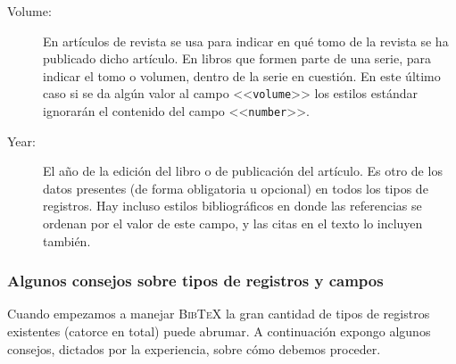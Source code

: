 \documentclass[a4paper,11pt]{article}
\def\btx-{\textsc{Bib\TeX}}
\def\ltr#1-{<<\texttt{#1}>>}
\begin{document}
\begin{description}
\item[Volume:] En artículos  de revista se usa para indicar en  qué tomo de la
  revista se ha  publicado dicho artículo.  En libros que  formen parte de una
  serie, para  indicar el tomo o volumen,  dentro de la serie  en cuestión. En
  este último  caso si  se da algún  valor al  campo \ltr volume-  los estilos
  estándar ignorarán el contenido del campo \ltr number-.

\item[Year:] El año de la edición  del libro o de publicación del artículo. Es
  otro de los  datos presentes (de forma obligatoria u  opcional) en todos los
  tipos  de  registros.   Hay  incluso  estilos bibliográficos  en  donde  las
  referencias se ordenan por  el valor de este campo, y las  citas en el texto
  lo incluyen también.

\end{description}

\subsubsection{Algunos consejos sobre tipos de registros y campos}
\label{sec:algun-cons-sobre}

Cuando  empezamos a  manejar  \btx- la  gran  cantidad de  tipos de  registros
existentes (catorce  en total) puede abrumar.  A  continuación expongo algunos
consejos, dictados por la experiencia, sobre cómo debemos proceder.
\end{document}
